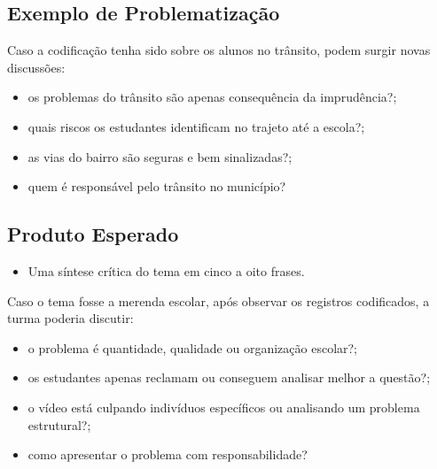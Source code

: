 \documentclass[
  letterpaper,
  DIV=11,
  numbers=noendperiod]{scrreport}
\providecommand{\tightlist}{%
  \setlength{\itemsep}{0pt}\setlength{\parskip}{0pt}}
\begin{document}
\subsection{Exemplo de
Problematização}\label{exemplo-de-problematizauxe7uxe3o}

Caso a codificação tenha sido sobre os alunos no trânsito, podem surgir
novas discussões:

\begin{itemize}
\tightlist
\item
  os problemas do trânsito são apenas consequência da imprudência?;
\item
  quais riscos os estudantes identificam no trajeto até a escola?;
\item
  as vias do bairro são seguras e bem sinalizadas?;
\item
  quem é responsável pelo trânsito no município?
\end{itemize}

\subsection{Produto Esperado}\label{produto-esperado-4}

\begin{itemize}
\tightlist
\item
  Uma síntese crítica do tema em cinco a oito frases.
\end{itemize}

\begin{tcolorbox}[enhanced jigsaw, arc=.35mm, bottomrule=.15mm, bottomtitle=1mm, breakable, colback=white, colbacktitle=quarto-callout-tip-color!10!white, colframe=quarto-callout-tip-color-frame, coltitle=black, left=2mm, leftrule=.75mm, opacityback=0, opacitybacktitle=0.6, rightrule=.15mm, title=\textcolor{quarto-callout-tip-color}{\faLightbulb}\hspace{0.5em}{Outro Exemplo Prático}, titlerule=0mm, toprule=.15mm, toptitle=1mm]

Caso o tema fosse a merenda escolar, após observar os registros
codificados, a turma poderia discutir:

\begin{itemize}
\tightlist
\item
  o problema é quantidade, qualidade ou organização escolar?;
\item
  os estudantes apenas reclamam ou conseguem analisar melhor a questão?;
\item
  o vídeo está culpando indivíduos específicos ou analisando um problema
  estrutural?;
\item
  como apresentar o problema com responsabilidade?
\end{itemize}

\end{tcolorbox}
\end{document}
